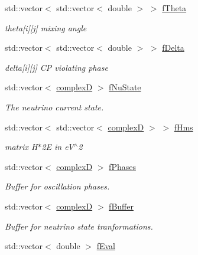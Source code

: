 \begin{DoxyCompactItemize}
std\+::vector$<$ std\+::vector$<$ double $>$ $>$ \hyperlink{classOscProb_1_1PMNS__Base_a1976887cd658dd86b2336c181f1470b4}{f\+Theta}
\begin{DoxyCompactList}\small\item\em theta\mbox{[}i\mbox{]}\mbox{[}j\mbox{]} mixing angle \end{DoxyCompactList}\item 
std\+::vector$<$ std\+::vector$<$ double $>$ $>$ \hyperlink{classOscProb_1_1PMNS__Base_ab2a5fa40e689b221c8a7d2c17213810d}{f\+Delta}
\begin{DoxyCompactList}\small\item\em delta\mbox{[}i\mbox{]}\mbox{[}j\mbox{]} CP violating phase \end{DoxyCompactList}\item 
std\+::vector$<$ \hyperlink{EigenPoint_8h_a67ca8e107e20610c3fff78d5e726ece0}{complexD} $>$ \hyperlink{classOscProb_1_1PMNS__Base_abf99f2339e3ee989600740b5d88063e8}{f\+Nu\+State}
\begin{DoxyCompactList}\small\item\em The neutrino current state. \end{DoxyCompactList}\item 
std\+::vector$<$ std\+::vector$<$ \hyperlink{EigenPoint_8h_a67ca8e107e20610c3fff78d5e726ece0}{complexD} $>$ $>$ \hyperlink{classOscProb_1_1PMNS__Base_acd3c8783e7603081eab316ea4c86c766}{f\+Hms}
\begin{DoxyCompactList}\small\item\em matrix H$\ast$2E in e\+V$^\wedge$2 \end{DoxyCompactList}\item 
std\+::vector$<$ \hyperlink{EigenPoint_8h_a67ca8e107e20610c3fff78d5e726ece0}{complexD} $>$ \hyperlink{classOscProb_1_1PMNS__Base_ab8d26b722047d49d977f5f2d83026ede}{f\+Phases}
\begin{DoxyCompactList}\small\item\em Buffer for oscillation phases. \end{DoxyCompactList}\item 
std\+::vector$<$ \hyperlink{EigenPoint_8h_a67ca8e107e20610c3fff78d5e726ece0}{complexD} $>$ \hyperlink{classOscProb_1_1PMNS__Base_a5440bc3efa466a37649601abce559e3e}{f\+Buffer}
\begin{DoxyCompactList}\small\item\em Buffer for neutrino state tranformations. \end{DoxyCompactList}\item 
std\+::vector$<$ double $>$ \hyperlink{classOscProb_1_1PMNS__Base_a6319c34d7decbb9d7d6da279c06e8c2d}{f\+Eval}

\end{DoxyCompactItemize}
